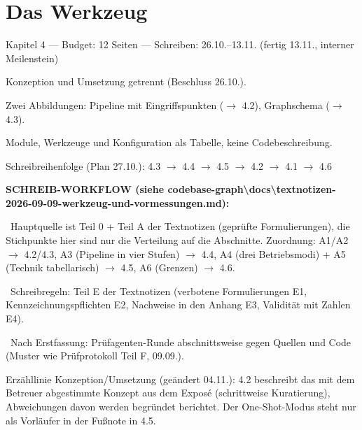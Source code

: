 
\chapter{Das Werkzeug}
\label{chap:werkzeug}
\begin{offen}
Kapitel 4 — Budget: 12 Seiten — Schreiben: 26.10.–13.11. (fertig 13.11., interner Meilenstein)\par
Konzeption und Umsetzung getrennt (Beschluss 26.10.).\par
Zwei Abbildungen: Pipeline mit Eingriffspunkten ($\rightarrow$ 4.2), Graphschema ($\rightarrow$ 4.3).\par
Module, Werkzeuge und Konfiguration als Tabelle, keine Codebeschreibung.\par
Schreibreihenfolge (Plan 27.10.): 4.3 $\rightarrow$ 4.4 $\rightarrow$ 4.5 $\rightarrow$ 4.2 $\rightarrow$ 4.1 $\rightarrow$ 4.6\par
\textbf{SCHREIB-WORKFLOW (siehe codebase-graph\textbackslash{}docs\textbackslash{}textnotizen-2026-09-09-werkzeug-und-vormessungen.md):}\par
\textbullet\ Hauptquelle ist Teil 0 + Teil A der Textnotizen (geprüfte Formulierungen), die Stichpunkte hier sind nur die Verteilung auf die Abschnitte. Zuordnung: A1/A2 $\rightarrow$ 4.2/4.3, A3 (Pipeline in vier Stufen) $\rightarrow$ 4.4, A4 (drei Betriebsmodi) + A5 (Technik tabellarisch) $\rightarrow$ 4.5, A6 (Grenzen) $\rightarrow$ 4.6.\par
\textbullet\ Schreibregeln: Teil E der Textnotizen (verbotene Formulierungen E1, Kennzeichnungspflichten E2, Nachweise in den Anhang E3, Validität mit Zahlen E4).\par
\textbullet\ Nach Erstfassung: Prüfagenten-Runde abschnittsweise gegen Quellen und Code (Muster wie Prüfprotokoll Teil F, 09.09.).\par
Erzähllinie Konzeption/Umsetzung (geändert 04.11.): 4.2 beschreibt das mit dem Betreuer abgestimmte Konzept aus dem Exposé (schrittweise Kuratierung), Abweichungen davon werden begründet berichtet. Der One-Shot-Modus steht nur als Vorläufer in der Fußnote in 4.5.
\end{offen}

